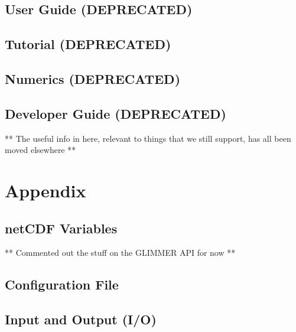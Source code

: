 
\chapter{User Guide (DEPRECATED)}
\renewcommand{\dir}{ug}


\chapter{Tutorial (DEPRECATED)}
\renewcommand{\dir}{tut}



\chapter{Numerics (DEPRECATED)}
\renewcommand{\dir}{num}


\chapter{Developer Guide (DEPRECATED)}
** The useful info in here, relevant to things that we still support, has all been moved elsewhere **
%

%

\part{Appendix}
\appendix
\renewcommand{\dir}{ug}
\chapter{netCDF Variables}

** Commented out the stuff on the GLIMMER API for now **
%
%
%
\renewcommand{\dir}{ext}


\chapter{Configuration File}
\renewcommand{\dir}{dg}


\chapter{Input and Output (I/O)}




